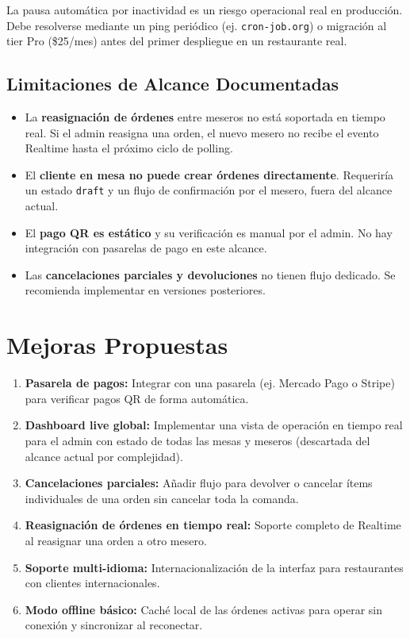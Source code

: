 \begin{alertbox}
La pausa automática por inactividad es un riesgo operacional real en producción.
Debe resolverse mediante un ping periódico (ej. \texttt{cron-job.org}) o migración
al tier Pro (\$25/mes) antes del primer despliegue en un restaurante real.
\end{alertbox}

\subsection{Limitaciones de Alcance Documentadas}

\begin{itemize}[leftmargin=1.5em]
  \item La \textbf{reasignación de órdenes} entre meseros no está soportada
        en tiempo real. Si el admin reasigna una orden, el nuevo mesero no
        recibe el evento Realtime hasta el próximo ciclo de polling.
  \item El \textbf{cliente en mesa no puede crear órdenes directamente}.
        Requeriría un estado \texttt{draft} y un flujo de confirmación por
        el mesero, fuera del alcance actual.
  \item El \textbf{pago QR es estático} y su verificación es manual por el
        admin. No hay integración con pasarelas de pago en este alcance.
  \item Las \textbf{cancelaciones parciales y devoluciones} no tienen flujo
        dedicado. Se recomienda implementar en versiones posteriores.
\end{itemize}

\section{Mejoras Propuestas}

\begin{enumerate}[leftmargin=1.8em]
  \item \textbf{Pasarela de pagos:} Integrar con una pasarela (ej. Mercado Pago
        o Stripe) para verificar pagos QR de forma automática.
  \item \textbf{Dashboard live global:} Implementar una vista de operación en
        tiempo real para el admin con estado de todas las mesas y meseros
        (descartada del alcance actual por complejidad).
  \item \textbf{Cancelaciones parciales:} Añadir flujo para devolver o cancelar
        ítems individuales de una orden sin cancelar toda la comanda.
  \item \textbf{Reasignación de órdenes en tiempo real:} Soporte completo de
        Realtime al reasignar una orden a otro mesero.
  \item \textbf{Soporte multi-idioma:} Internacionalización de la interfaz
        para restaurantes con clientes internacionales.
  \item \textbf{Modo offline básico:} Caché local de las órdenes activas para
        operar sin conexión y sincronizar al reconectar.
\end{enumerate}